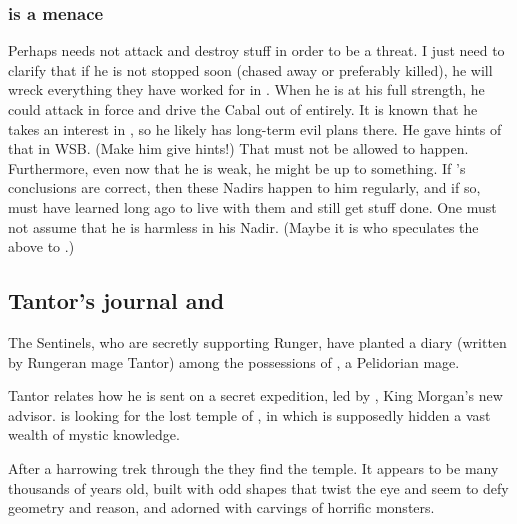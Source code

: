 \subsubsection{\Ishnaruchaefir is a menace}
Perhaps \Ishnaruchaefir needs not attack and destroy stuff in order to be a threat. 
I just need to clarify that if he is not stopped soon (chased away or preferably killed), he will wreck everything they have worked for in \Malcur.
When he is at his full strength, he could attack in force and drive the Cabal out of \Malcur entirely.
It is known that he takes an interest in \Malcur, so he likely has long-term evil plans there.
He gave hints of that in WSB. (Make him give hints!)
That must not be allowed to happen.
Furthermore, even now that he is weak, he might be up to something.
If \Urizeth's conclusions are correct, then these Nadirs happen to him regularly, and if so, \Ishnaruchaefir must have learned long ago to live with them and still get stuff done.
One must not assume that he is harmless in his Nadir.
(Maybe it is \Azraid who speculates the above to \Teshrial.)










\subsection[Tantor's journal and Eresh-Kal]{Tantor's journal and \EreshKal}
The Sentinels, who are secretly supporting Runger, have planted a diary (written by Rungeran mage \Jirad{} Tantor) among the possessions of \Ambrose{} \Onatol, a Pelidorian \ishrah{} mage. 

Tantor relates how he is sent on a secret expedition, led by \Takestsha, King Morgan's new advisor. \Takestsha{} is looking for the lost temple of \Rungertemple, in which is supposedly hidden a vast wealth of mystic knowledge. 

After a harrowing trek through the \Wylde{} they find the temple. It appears to be many thousands of years old, built with odd shapes that twist the eye and seem to defy geometry and reason, and adorned with carvings of horrific monsters. 

